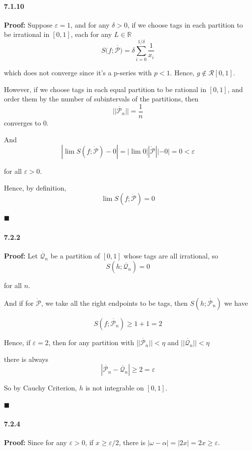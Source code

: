 \documentclass[11pt]{article}
\newcommand{\qed}{
	\begin{flushright}
		$\blacksquare$
	\end{flushright}}
\begin{document}
	\paragraph{7.1.10}\textbf{Proof:}
		Suppose $\varepsilon = 1$, and for any $\delta > 0$, if we choose tags in each partition to be irrational in $[0, 1]$, each for any $L \in \mathbb{R}$
			\[S(f; \dot{\mathcal{P})} = {\delta} \sum_{i = 0}^{1/\delta} \frac{1}{x_i}\]
			
			which does not converge since it's a p-series with $p < 1$. Hence, $g \notin \mathcal{R}[0, 1]$.
			
		However, if we choose tags in each equal partition to be rational in $[0, 1]$, and order them by the number of subintervals of the partitions, then
		\[||\dot{\mathcal{P}_n}|| = \frac{1}{n}\] converges to $0$.
		
		And \[|\lim S(f; \dot{\mathcal{P}}) - 0| = |\lim 0 ||\dot{\mathcal{P}}|| - 0| = 0 < \varepsilon\]
		
		for all $\varepsilon > 0$.
		
		Hence, by definition, 
		\[\lim S(f; \dot{\mathcal{P}}) = 0\]
		\qed
			
			
	\paragraph{7.2.2}\textbf{Proof:}
		Let $\dot{\mathcal{Q}_{n}}$ be a partition of $[0, 1]$ whose tags are all irrational, so
			\[S(h; \dot{\mathcal{Q}_n}) = 0\]
			
			for all $n$. 
						
			And if for $\dot{\mathcal{P}}$, we take all the right endpoints to be tags, then $S(h; \dot{\mathcal{P}_n})$ we have
			
			\[S(f; \dot{\mathcal{P}_n}) \geq 1 + 1 = 2\]
			
		Hence, if $\varepsilon = 2$, then for any partition with $||\dot{\mathcal{P}_n}||< \eta$ and $||\dot{\mathcal{Q}_n}||< \eta$
		
		there is always
		\[|\dot{\mathcal{P}_n} - \dot{\mathcal{Q}_n}| \geq 2 = \varepsilon\]
		
		So by Cauchy Criterion, $h$ is not integrable on $[0, 1]$.
		\qed
			
	\paragraph{7.2.4}\textbf{Proof:}
		Since for any $\varepsilon > 0$, if $x \geq \varepsilon / 2$, there is $|\omega - \alpha| = |2x| = 2x \geq \varepsilon$.
		
\end{document}
